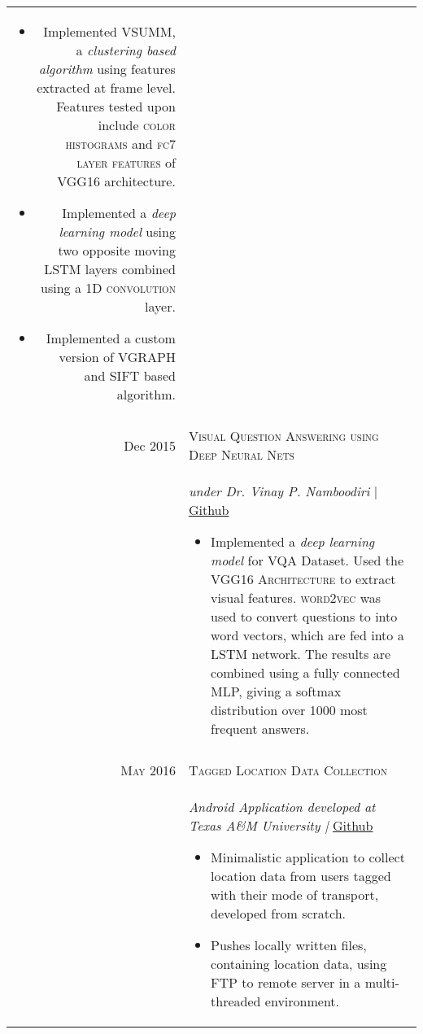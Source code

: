 \documentclass[a4paper,10pt]{article}
\begin{document}
\begin{longtable}{r|p{15cm}}
\begin{itemize}
\item Implemented VSUMM, a \textit{clustering based algorithm} using features extracted at frame level. Features tested upon include \textsc{color histograms} and \textsc{fc7 layer features} of \textsc{VGG16} architecture.
\item Implemented a \textit{deep learning model} using two opposite moving \textsc{LSTM} layers combined using a \textsc{1D convolution} layer.
\item Implemented a custom version of VGRAPH and SIFT based algorithm.\vspace*{-\baselineskip}
\end{itemize}\\
\multicolumn{2}{c}{}\\
Dec 2015 & \large \textsc{Visual Question Answering using Deep Neural Nets}\\
& \textit{under Dr. Vinay P. Namboodiri } | \href{https://github.com/architsharma97/VisualQA}{Github}
\begin{itemize}
\item Implemented a \textit{deep learning model} for VQA Dataset. Used the \textsc{VGG16 Architecture} to extract visual features. \textsc{word2vec} was used to convert questions to into word vectors, which are fed into a LSTM network. The results are combined using a fully connected MLP, giving a softmax distribution over 1000 most frequent answers.\vspace*{-\baselineskip}
\end{itemize}\\
\multicolumn{2}{c}{}\\
\textsc{May 2016} & \large \textsc{Tagged Location Data Collection}\\
& \textit{Android Application developed at Texas A\&M University | } \href{https://github.com/architsharma97/LocationTagger}{Github}
\begin{itemize}
\item Minimalistic application to collect location data from users tagged with their mode of transport, developed from scratch.
\item Pushes locally written files, containing location data, using FTP to remote server in a multi-threaded environment.\vspace*{-\baselineskip}
\end{itemize}\\
\end{longtable}
\end{document}
